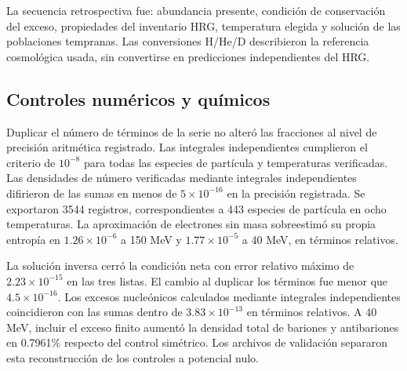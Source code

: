 La secuencia retrospectiva fue: abundancia presente, condición de conservación del exceso, propiedades del inventario HRG, temperatura elegida y solución de las poblaciones tempranas. Las conversiones H/He/D describieron la referencia cosmológica usada, sin convertirse en predicciones independientes del HRG.

\subsection{Controles numéricos y químicos}
Duplicar el número de términos de la serie no alteró las fracciones al nivel de precisión aritmética registrado. Las integrales independientes cumplieron el criterio de $10^{-8}$ para todas las especies de partícula y temperaturas verificadas. Las densidades de número verificadas mediante integrales independientes difirieron de las sumas en menos de $5\times10^{-16}$ en la precisión registrada. Se exportaron 3544 registros, correspondientes a 443 especies de partícula en ocho temperaturas. La aproximación de electrones sin masa sobreestimó su propia entropía en $1.26\times10^{-6}$ a 150 MeV y $1.77\times10^{-5}$ a 40 MeV, en términos relativos.

La solución inversa cerró la condición neta con error relativo máximo de $2.23\times10^{-15}$ en las tres listas. El cambio al duplicar los términos fue menor que $4.5\times10^{-16}$. Los excesos nucleónicos calculados mediante integrales independientes coincidieron con las sumas dentro de $3.83\times10^{-13}$ en términos relativos. A 40 MeV, incluir el exceso finito aumentó la densidad total de bariones y antibariones en 0.7961\% respecto del control simétrico. Los archivos de validación separaron esta reconstrucción de los controles a potencial nulo.
